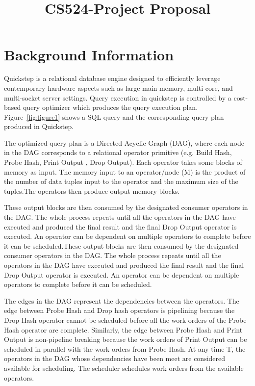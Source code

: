 \documentclass[20pt]{sigchi}
\def\plaintitle{CS524-Project Proposal}
\begin{document}
\title{\plaintitle}

\normal

\maketitle

\section{Background Information}
Quickstep is a relational database engine designed to efficiently leverage contemporary hardware aspects such as large main memory, multi-core, and multi-socket server settings.
Query execution in quickstep is controlled by a cost-based query optimizer which produces the query execution plan. Figure~\ref{fig:figure1} shows a SQL query and the corresponding  query plan produced in Quickstep. 

The optimized query plan is  a Directed Acyclic Graph (DAG), where each node in the DAG corresponds to a relational operator primitive (e.g. Build Hash, Probe Hash, Print Output , Drop Output). 
Each operator takes some blocks of memory as input. The memory input to an operator/node (M) is the product of the number of data tuples input to the operator and the maximum size of the tuples.The operators then produce output memory blocks. 

These output blocks are then consumed by the designated consumer operators in the DAG. The whole process repeats until all the operators in the DAG have executed and produced the final result and the final Drop Output operator is executed. An operator can be dependent on multiple operators to complete before it can be scheduled.These output blocks are then consumed by the designated consumer operators in the DAG. The whole process repeats until all the operators in the DAG have executed and produced the final result and the final Drop Output operator is executed. An operator can be dependent on multiple operators to complete before it can be scheduled.

The edges in the DAG represent the dependencies between the operators. 
The edge between Probe Hash and Drop hash operators is pipelining because the  Drop Hash operator cannot be scheduled before all the work orders of the Probe Hash operator are complete. 
Similarly, the edge between Probe Hash and Print Output is non-pipeline breaking because the work orders of Print Output can be scheduled in parallel with the work orders from Probe Hash. 
At any time T, the operators in the DAG whose dependencies have been meet are considered available for scheduling.
The scheduler schedules work orders from the available operators.
\end{document}
